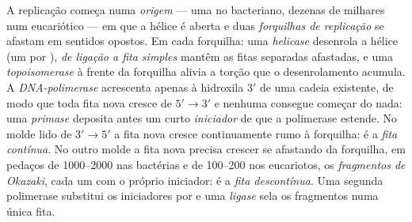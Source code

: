 \begin{definition}\label{def:b1:replication-mitosis:fork}
A replicação começa numa \emph{origem} --- uma no  bacteriano,
dezenas de milhares num  eucariótico --- em que a hélice é aberta
e duas \emph{forquilhas de replicação} se afastam em sentidos opostos.
Em cada forquilha: uma \emph{helicase} desenrola a hélice (um  por
), \emph{ de ligação a fita simples} mantêm as
fitas separadas afastadas, e uma \emph{topoisomerase} à frente da
forquilha alivia a torção que o desenrolamento acumula. A
\emph{DNA-polimerase} acrescenta  apenas à hidroxila $3'$ de
uma cadeia existente, de modo que toda fita nova cresce de $5' \to 3'$ e
nenhuma consegue começar do nada: uma \emph{primase} deposita antes um
curto \emph{iniciador} de  que a polimerase estende. No molde lido de
$3' \to 5'$ a fita nova cresce continuamente rumo à forquilha: é a
\emph{fita contínua}. No outro molde a fita nova precisa crescer se
afastando da forquilha, em pedaços de \qtyrange{1000}{2000}{}
 nas bactérias e de \qtyrange{100}{200}{} nos eucariotos, os
\emph{fragmentos de Okazaki}, cada um com o próprio iniciador: é a
\emph{fita descontínua}. Uma segunda polimerase substitui os iniciadores
por  e uma \emph{ligase} sela os fragmentos numa única fita.
\end{definition}

